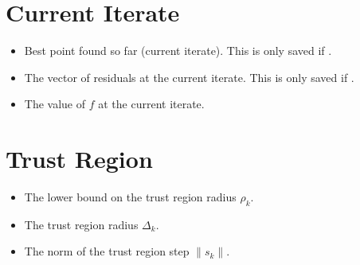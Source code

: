 \documentclass[letterpaper,10pt,english]{sphinxmanual}
\begin{document}
\section{Current Iterate}
\label{\detokenize{diagnostic:current-iterate}}\begin{itemize}
\item {} 
 \sphinxhyphen{} Best point found so far (current iterate). This is only saved if .

\item {} 
 \sphinxhyphen{} The vector of residuals at the current iterate. This is only saved if .

\item {} 
 \sphinxhyphen{} The value of \(f\) at the current iterate.

\end{itemize}


\section{Trust Region}
\label{\detokenize{diagnostic:trust-region}}\begin{itemize}
\item {} 
 \sphinxhyphen{} The lower bound on the trust region radius \(\rho_k\).

\item {} 
 \sphinxhyphen{} The trust region radius \(\Delta_k\).

\item {} 
 \sphinxhyphen{} The norm of the trust region step \(\|s_k\|\).

\end{itemize}
\end{document}
